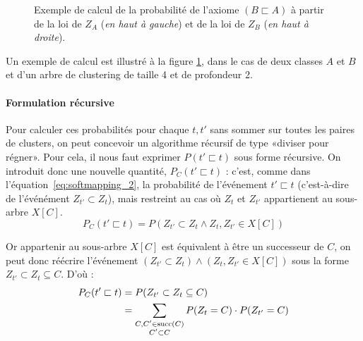 \begin{figure}[h]
    \centering
    
    \caption[Principe de la méthode de liaison multiple]{Exemple de calcul de la probabilité de l'axiome $(B \sqsubset A)$ à partir de la loi de $Z_A$ (\textit{en haut à gauche}) et de la loi de $Z_B$ (\textit{en haut à droite}).}
    \label{fig:te-softmapping-example}
\end{figure}

Un exemple de calcul est illustré à la figure \ref{fig:te-softmapping-example}, dans le cas de deux classes $A$ et $B$ et d'un arbre de clustering de taille 4 et de profondeur 2.

\paragraph{Formulation récursive}

Pour calculer ces probabilités pour chaque $t, t'$ sans sommer sur toutes les paires de clusters, on peut concevoir un algorithme récursif de type «diviser pour régner». Pour cela, il nous faut exprimer $P(t' \sqsubset t)$ sous forme récursive. On introduit donc une nouvelle quantité,  $P_C(t' \sqsubset t)$ : c'est, comme dans l'équation~\ref{eq:softmapping_2}, la probabilité de l'événement $t' \sqsubset t$ (c'est-à-dire de l'événément $Z_{t'} \subset Z_{t}$), mais restreint au cas où $Z_t$ et $Z_{t'}$ appartienent au sous-arbre $X[C]$.
\begin{equation}
    P_C(t' \sqsubset t) = P(Z_{t'} \subset Z_{t} \land Z_t, Z_{t'} \in X[C])
\end{equation}

Or appartenir au sous-arbre $X[C]$ est équivalent à être un successeur de $C$, on peut donc réécrire l'événement $(Z_{t'} \subset Z_{t}) \land (Z_t, Z_{t'} \in X[C])$ sous la forme $Z_{t'} \subset Z_{t} \subseteq C$. D'où :
\begin{align}
    P_C(t' \sqsubset t) &= P(Z_{t'} \subset Z_{t} \subseteq C) \nonumber \\
    &= \sum_{\substack{C, C' \in \operatorname{succ}(C) \\  C' \subset C}} P(Z_t = C)\cdot P(Z_{t'} = C) \label{eq:proba_subsumption}
\end{align}


